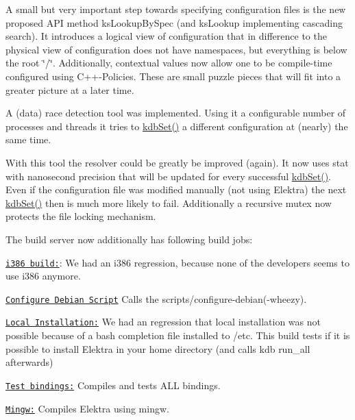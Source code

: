 A small but very important step towards specifying configuration files is the new proposed A\+PI method ks\+Lookup\+By\+Spec (and ks\+Lookup implementing cascading search). It introduces a {\ttfamily logical view} of configuration that in difference to the {\ttfamily physical view} of configuration does not have namespaces, but everything is below the root \char`\"{}/\char`\"{}. Additionally, contextual values now allow one to be compile-\/time configured using C++-\/\+Policies. These are small puzzle pieces that will fit into a greater picture at a later time.

A (data) race detection tool was implemented. Using it a configurable number of processes and threads it tries to \hyperlink{group__kdb_ga11436b058408f83d303ca5e996832bcf}{kdb\+Set()} a different configuration at (nearly) the same time.

With this tool the resolver could be greatly be improved (again). It now uses stat with nanosecond precision that will be updated for every successful \hyperlink{group__kdb_ga11436b058408f83d303ca5e996832bcf}{kdb\+Set()}. Even if the configuration file was modified manually (not using Elektra) the next \hyperlink{group__kdb_ga11436b058408f83d303ca5e996832bcf}{kdb\+Set()} then is much more likely to fail. Additionally a recursive mutex now protects the file locking mechanism.

The build server now additionally has following build jobs\+:


\begin{DoxyItemize}
\item \href{https://build.libelektra.org/job/elektra-gcc-i386/}{\tt i386 build\+:}\+: We had an i386 regression, because none of the developers seems to use i386 anymore.
\item \href{https://build.libelektra.org/job/elektra-gcc-configure-debian/}{\tt Configure Debian Script} Calls the scripts/configure-\/debian(-\/wheezy).
\item \href{https://build.libelektra.org/job/elektra-local-installation/}{\tt Local Installation\+:} We had an regression that local installation was not possible because of a bash completion file installed to /etc. This build tests if it is possible to install Elektra in your home directory (and calls kdb run\+\_\+all afterwards)
\item \href{https://build.libelektra.org/job/elektra-test-bindings/}{\tt Test bindings\+:} Compiles and tests A\+LL bindings.
\item \href{https://build.libelektra.org/job/elektra-gcc-configure-mingw-w64/}{\tt Mingw\+:} Compiles Elektra using mingw.
\end{DoxyItemize}

